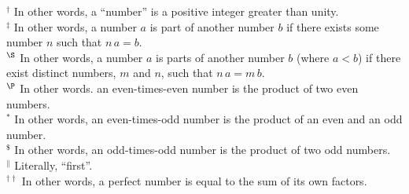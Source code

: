 {\footnotesize\noindent$^\dag$ In other words, a
``number'' is a positive integer greater than unity.\\[0.5ex]
$^\ddag$ In other words, a number $a$ is part of
another number $b$ if there exists some number $n$ such
that $n\,a = b$.\\[0.5ex]
$^\S$  In other words, a number $a$ is parts of another number
$b$ (where $a<b$) if there exist distinct numbers, $m$ and $n$, such that $n\,a=m\,b$.\\[0.5ex]
$^\P$ In other words.
an even-times-even number is the product of two even numbers.\\[0.5ex]
$^\ast$ In other words,
an even-times-odd number is the product of an even and an odd number.\\[0.5ex]
$^\$$ In other words,
an odd-times-odd number is the product of two odd numbers.\\[0.5ex]
$^\|$ Literally, ``first''.\\[0.5ex]
$^{\dag\dag}$  In other words, a perfect number is equal to the sum of its own factors.}

